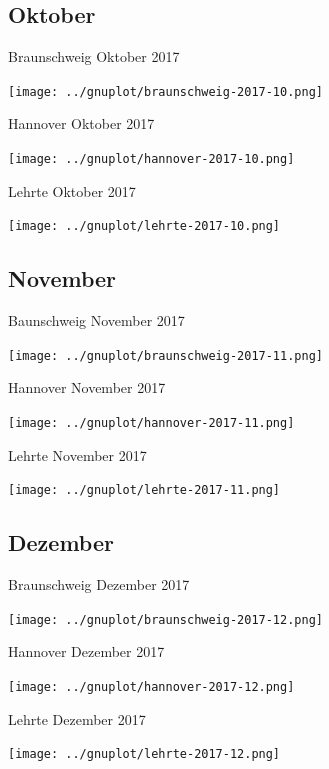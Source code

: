 \documentclass[aspectratio=169]{beamer} %
\begin{document}
\subsection{Oktober}
\begin{frame}{Braunschweig Oktober 2017}
  \begin{center}
    \texttt{[image: ../gnuplot/braunschweig-2017-10.png]}
  \end{center}
\end{frame}
\begin{frame}{Hannover Oktober 2017}
  \begin{center}
    \texttt{[image: ../gnuplot/hannover-2017-10.png]}
  \end{center}
\end{frame}
\begin{frame}{Lehrte Oktober 2017}
  \begin{center}
    \texttt{[image: ../gnuplot/lehrte-2017-10.png]}
  \end{center}
\end{frame}

\subsection{November}
\begin{frame}{Baunschweig November 2017}
  \begin{center}
    \texttt{[image: ../gnuplot/braunschweig-2017-11.png]}
  \end{center}
\end{frame}
\begin{frame}{Hannover November 2017}
  \begin{center}
    \texttt{[image: ../gnuplot/hannover-2017-11.png]}
  \end{center}
\end{frame}
\begin{frame}{Lehrte November 2017}
  \begin{center}
    \texttt{[image: ../gnuplot/lehrte-2017-11.png]}
  \end{center}
\end{frame}

\subsection{Dezember}
\begin{frame}{Braunschweig Dezember 2017}
  \begin{center}
    \texttt{[image: ../gnuplot/braunschweig-2017-12.png]}
  \end{center}
\end{frame}
\begin{frame}{Hannover Dezember 2017}
  \begin{center}
    \texttt{[image: ../gnuplot/hannover-2017-12.png]}
  \end{center}
\end{frame}
\begin{frame}{Lehrte Dezember 2017}
  \begin{center}
    \texttt{[image: ../gnuplot/lehrte-2017-12.png]}
  \end{center}
\end{frame}
\end{document}
